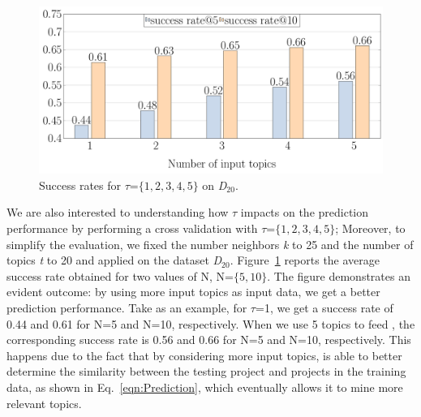 \begin{figure}[h!]
	\centering
	\vspace{-.2cm}
	\includegraphics[width=0.80\linewidth]{figs/successRate_inputTopic.pdf}
	\vspace{-.2cm}
	\caption{Success rates for $\tau$=$\{1,2,3,4,5\}$ on 
	\textit{D$_{20}$}.}
	\label{fig:pr-input-topics}
\end{figure} 



We are also interested to understanding how $\tau$ impacts on 
the prediction performance by performing a cross validation with 
$\tau$=$\{1,2,3,4,5\}$; Moreover, to simplify the evaluation, we 
fixed the number neighbors \emph{k} to 25 and the number of 
topics \emph{t} to 20 and applied \TF on the dataset 
\textit{D$_{20}$}. Figure~\ref{fig:pr-input-topics} reports 
the average success rate obtained for two values of N, \ie 
N=$\{5,10\}$. %
The figure demonstrates an evident outcome: by using more input topics as input data, we get a better prediction performance. Take as an example, for $\tau$=1, we get a success rate of 0.44 and 0.61 for N=5 and N=10, respectively. When we use 5 topics to feed \TFa, the corresponding success rate is 0.56 and 0.66 for N=5 and N=10, respectively. This happens due to the fact that by considering more input topics, \TFa is able to better determine the similarity between the testing project and projects in the training data, as shown in Eq.~\ref{eqn:Prediction}, which eventually allows it to mine more relevant topics.







